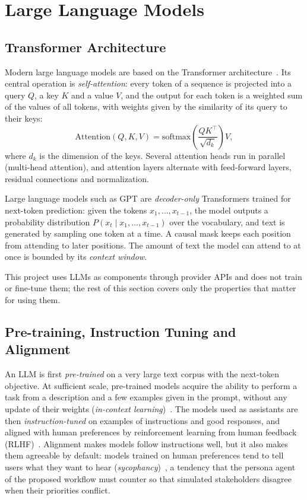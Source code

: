 \section{Large Language Models}
\label{sec:bg-llm}

\subsection{Transformer Architecture}
\label{sec:bg-transformer}

Modern large language models are based on the Transformer architecture~\cite{vaswani2017attention}. Its central operation is \emph{self-attention}: every token of a sequence is projected into a query $Q$, a key $K$ and a value $V$, and the output for each token is a weighted sum of the values of all tokens, with weights given by the similarity of its query to their keys:
\begin{equation}
    \mathrm{Attention}(Q, K, V) = \mathrm{softmax}\!\left(\frac{QK^\top}{\sqrt{d_k}}\right) V,
\end{equation}
where $d_k$ is the dimension of the keys. Several attention heads run in parallel (multi-head attention), and attention layers alternate with feed-forward layers, residual connections and normalization.

Large language models such as GPT are \emph{decoder-only} Transformers trained for next-token prediction: given the tokens $x_1, \dots, x_{t-1}$, the model outputs a probability distribution $P(x_t \mid x_1, \dots, x_{t-1})$ over the vocabulary, and text is generated by sampling one token at a time. A causal mask keeps each position from attending to later positions. The amount of text the model can attend to at once is bounded by its \emph{context window}.

This project uses LLMs as components through provider APIs and does not train or fine-tune them; the rest of this section covers only the properties that matter for using them.

\subsection{Pre-training, Instruction Tuning and Alignment}
\label{sec:bg-pretraining}

An LLM is first \emph{pre-trained} on a very large text corpus with the next-token objective. At sufficient scale, pre-trained models acquire the ability to perform a task from a description and a few examples given in the prompt, without any update of their weights (\emph{in-context learning})~\cite{brown2020language}. The models used as assistants are then \emph{instruction-tuned} on examples of instructions and good responses, and aligned with human preferences by reinforcement learning from human feedback (RLHF)~\cite{ouyang2022training}. Alignment makes models follow instructions well, but it also makes them agreeable by default: models trained on human preferences tend to tell users what they want to hear (\emph{sycophancy})~\cite{sharma2024sycophancy}, a tendency that the persona agent of the proposed workflow must counter so that simulated stakeholders disagree when their priorities conflict.

